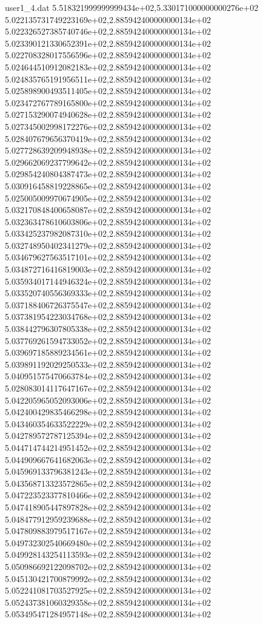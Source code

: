 \begin{filecontents}{user1_4.dat}
5.518321999999999434e+02,5.330171000000000276e+02
5.022135731749223169e+02,2.885942400000000134e+02
5.022326527385740746e+02,2.885942400000000134e+02
5.023390121330652391e+02,2.885942400000000134e+02
5.022708328017556596e+02,2.885942400000000134e+02
5.024644510912082183e+02,2.885942400000000134e+02
5.024835765191956511e+02,2.885942400000000134e+02
5.025898900493511405e+02,2.885942400000000134e+02
5.023472767789165800e+02,2.885942400000000134e+02
5.027153290074940628e+02,2.885942400000000134e+02
5.027345002998172276e+02,2.885942400000000134e+02
5.028407679656370419e+02,2.885942400000000134e+02
5.027728639209948938e+02,2.885942400000000134e+02
5.029662069237799642e+02,2.885942400000000134e+02
5.029854240804387473e+02,2.885942400000000134e+02
5.030916458819228865e+02,2.885942400000000134e+02
5.025005009970674905e+02,2.885942400000000134e+02
5.032170848400658087e+02,2.885942400000000134e+02
5.032363478610603806e+02,2.885942400000000134e+02
5.033425237982087310e+02,2.885942400000000134e+02
5.032748950402341279e+02,2.885942400000000134e+02
5.034679627563517101e+02,2.885942400000000134e+02
5.034872716416819003e+02,2.885942400000000134e+02
5.035934017144946324e+02,2.885942400000000134e+02
5.033520740556369333e+02,2.885942400000000134e+02
5.037188406726375547e+02,2.885942400000000134e+02
5.037381954223034768e+02,2.885942400000000134e+02
5.038442796307805338e+02,2.885942400000000134e+02
5.037769261594733052e+02,2.885942400000000134e+02
5.039697185889234561e+02,2.885942400000000134e+02
5.039891192029250533e+02,2.885942400000000134e+02
5.040951575470663784e+02,2.885942400000000134e+02
5.028083014117647167e+02,2.885942400000000134e+02
5.042205965052093006e+02,2.885942400000000134e+02
5.042400429835466298e+02,2.885942400000000134e+02
5.043460354633522229e+02,2.885942400000000134e+02
5.042789572787125394e+02,2.885942400000000134e+02
5.044714744214951452e+02,2.885942400000000134e+02
5.044909667641682063e+02,2.885942400000000134e+02
5.045969133796381243e+02,2.885942400000000134e+02
5.043568713323572865e+02,2.885942400000000134e+02
5.047223523377810466e+02,2.885942400000000134e+02
5.047418905447897828e+02,2.885942400000000134e+02
5.048477912959239688e+02,2.885942400000000134e+02
5.047809883979517167e+02,2.885942400000000134e+02
5.049732302540669480e+02,2.885942400000000134e+02
5.049928143254113593e+02,2.885942400000000134e+02
5.050986692122098702e+02,2.885942400000000134e+02
5.045130421700879992e+02,2.885942400000000134e+02
5.052241081703527925e+02,2.885942400000000134e+02
5.052437381060329358e+02,2.885942400000000134e+02
5.053495471284957148e+02,2.885942400000000134e+02

\end{filecontents}
